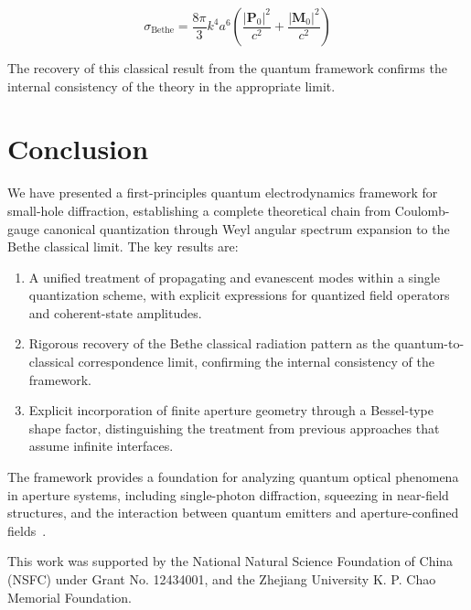 \documentclass[%
 reprint,
 amsmath,amssymb,
 aps,
 floatfix,
]{revtex4-2}
\begin{document}
\begin{equation}
\sigma_\text{Bethe} = \frac{8\pi}{3}k^4a^6\left(\frac{|\mathbf{P}_0|^2}{c^2} + \frac{|\mathbf{M}_0|^2}{c^2}\right)
\end{equation}

The recovery of this classical result from the quantum framework confirms the internal consistency of the theory in the appropriate limit.

\section{Conclusion}

We have presented a first-principles quantum electrodynamics framework for small-hole diffraction, establishing a complete theoretical chain from Coulomb-gauge canonical quantization through Weyl angular spectrum expansion to the Bethe classical limit. The key results are:

\begin{enumerate}
\item A unified treatment of propagating and evanescent modes within a single quantization scheme, with explicit expressions for quantized field operators and coherent-state amplitudes.
\item Rigorous recovery of the Bethe classical radiation pattern as the quantum-to-classical correspondence limit, confirming the internal consistency of the framework.
\item Explicit incorporation of finite aperture geometry through a Bessel-type shape factor, distinguishing the treatment from previous approaches that assume infinite interfaces.
\end{enumerate}

The framework provides a foundation for analyzing quantum optical phenomena in aperture systems, including single-photon diffraction, squeezing in near-field structures, and the interaction between quantum emitters and aperture-confined fields~\cite{Novotny2012}.

\begin{acknowledgments}
This work was supported by the National Natural Science Foundation of China (NSFC) under Grant No. 12434001, and the Zhejiang University K. P. Chao Memorial Foundation.
\end{acknowledgments}


\end{document}
